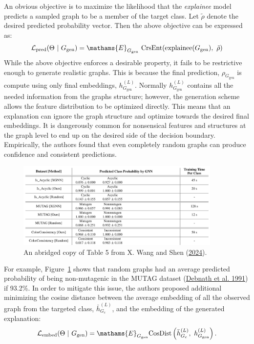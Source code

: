 \documentclass[
  11pt,
  letterpaper,
]{article}
\begin{document}
\quad An obvious objective is to maximize the likelihood that the
\emph{explainee} model predicts a sampled graph to be a member of the
target class. Let \(\tilde{\rho}\) denote the desired predicted
probability vector. Then the above objective can be expressed as:
\begin{equation} \label{l-pred}
        \mathcal{L}_\text{pred} (\Theta \ | \ G_\text{gen}) = \mathams{E}_{G_\text{gen}} \ \text{CrsEnt} (\text{explainee}(G_\text{gen}), \ \tilde{\rho})
    \end{equation} While the above objective enforces a desirable
property, it fails to be restrictive enough to generate realistic
graphs. This is because the final prediction, \(\rho_{G_{\text{gen}}}\)
is compute using only final embeddings, \(h^{(L)}_{G_{\text{gen}}}\).
Normally \(h^{(L)}_{G_{\text{gen}}}\) contains all the needed
information from the graphs structure; however, the generation scheme
allows the feature distribution to be optimized directly. This means
that an explanation can ignore the graph structure and optimize towards
the desired final embeddings. It is dangerously common for nonsensical
features and structures at the graph level to end up on the desired side
of the decision boundary. Empirically, the authors found that even
completely random graphs can produce confidence and consistent
predictions.

\begin{figure}

{\centering \includegraphics[width=0.9\textwidth,height=\textheight]{figures/random_baseline.png}

}

\caption{\label{fig-random-baseline}An abridged copy of Table 5 from X.
Wang and Shen (\protect\hyperlink{ref-Wang_Shen_2024}{2024}).}

\end{figure}

For example, Figure~\ref{fig-random-baseline} shows that random graphs
had an average predicted probability of being non-mutagenic in the MUTAG
dataset (\protect\hyperlink{ref-Debnath_1991}{Debnath et al. 1991}) if
93.2\%. In order to mitigate this issue, the authors proposed additional
minimizing the cosine distance between the average embedding of all the
observed graph from the targeted class, \(\bar h^{(L)}_{G_c}\), and the
embedding of the generated explanation: \begin{equation} \label{l-embed}
       \mathcal{L}_{\text{embed}}(\Theta \ | \ G_\text{gen}) = 
            \mathams{E}_{G_\text{gen}}
            \text{CosDist}\left( \bar h^{(L)}_{G_c}, \ h^{(L)}_{G_\text{gen}} \right). 
    \end{equation}
\end{document}
